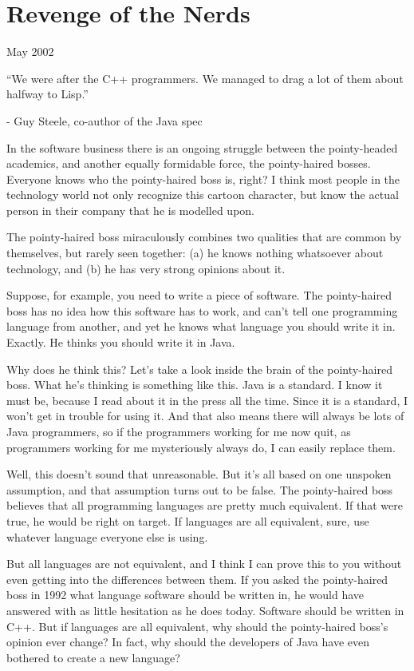 \chapter{Revenge of the Nerds}

May 2002

``We were after the C++ programmers. We managed to drag a lot of them
about halfway to Lisp.''

- Guy Steele, co-author of the Java spec

In the software business there is an ongoing struggle between the
pointy-headed academics, and another equally formidable force, the
pointy-haired bosses. Everyone knows who the pointy-haired boss is,
right? I think most people in the technology world not only recognize
this cartoon character, but know the actual person in their company that
he is modelled upon.

The pointy-haired boss miraculously combines two qualities that are
common by themselves, but rarely seen together: (a) he knows nothing
whatsoever about technology, and (b) he has very strong opinions about
it.

Suppose, for example, you need to write a piece of software. The
pointy-haired boss has no idea how this software has to work, and can't
tell one programming language from another, and yet he knows what
language you should write it in. Exactly. He thinks you should write it
in Java.

Why does he think this? Let's take a look inside the brain of the
pointy-haired boss. What he's thinking is something like this. Java is a
standard. I know it must be, because I read about it in the press all
the time. Since it is a standard, I won't get in trouble for using it.
And that also means there will always be lots of Java programmers, so if
the programmers working for me now quit, as programmers working for me
mysteriously always do, I can easily replace them.

Well, this doesn't sound that unreasonable. But it's all based on one
unspoken assumption, and that assumption turns out to be false. The
pointy-haired boss believes that all programming languages are pretty
much equivalent. If that were true, he would be right on target. If
languages are all equivalent, sure, use whatever language everyone else
is using.

But all languages are not equivalent, and I think I can prove this to
you without even getting into the differences between them. If you asked
the pointy-haired boss in 1992 what language software should be written
in, he would have answered with as little hesitation as he does today.
Software should be written in C++. But if languages are all equivalent,
why should the pointy-haired boss's opinion ever change? In fact, why
should the developers of Java have even bothered to create a new
language?

